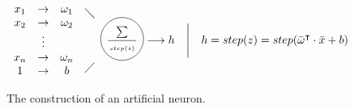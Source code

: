 \documentclass[10pt]{article}
\newcommand*\circled[1]{\tikz[baseline=(char.base)]{
   \node[shape=circle,draw,inner sep=1pt] (char) {#1};}}
\newif\ifen
\newif\ifde
\newcommand{\en}[1]{\ifen#1\fi}
\newcommand{\de}[1]{\ifde#1\fi}
\begin{document}
				\begin{figure}[H]
					\[
						\begin{array}{c}
							x_1\\
							x_2\\
							\color{white}\vdots\\
							x_n\\
							1\\
						\end{array}
						\begin{array}{c}
							\rightarrow\\
							\rightarrow\\
							\vdots\\
							\rightarrow\\
							\rightarrow\\
						\end{array}
						\begin{array}{c}
							\omega_1\\
							\omega_2\\
							\color{white}\vdots\\
							\omega_n\\
							b\\
						\end{array}
						\begin{array}{c}
							\diagdown\\
							\\
							\\
							\\
							\diagup\\
						\end{array}
						\circled{${\sum\atop\ }\over{\ \atop step(z)}$}
						\longrightarrow h
						\quad\Biggl\lvert \quad h = step(z) = step(\bar{\omega}^\intercal \cdot \bar{x} + b)
					\]
					\caption{The construction of an artificial neuron.}
				\end{figure}

				\de{Das künstliche neuronale Netz baut sich aus vielen hintereinandergeschalteten Layern zusammen, welche wiederrum parallel geschaltete Neuronen enthalten:}
				\en{The artificial neural network is composed of many layers connected in series, which again contain neurons connected in parallel:}
\end{document}
